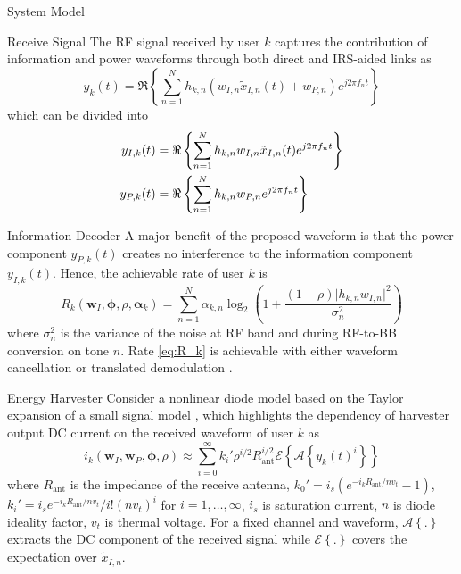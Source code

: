 \documentclass{IEEEtran}
\begin{document}
\begin{section}{System Model}
	\begin{subsection}{Receive Signal}
		The RF signal received by user $k$ captures the contribution of information and power waveforms through both direct and IRS-aided links as
		\begin{equation}\label{eq:y_k}
			y_k(t)=\Re\left\{\sum_{n=1}^N{h_{{k,n}}}\left({w_{I,n}\tilde{x}_{I,n}(t)}+w_{P,n}\right){e^{j2{\pi}{f_n}{t}}}\right\}
		\end{equation}
		which can be divided into
		\begin{align}\label{eq:y_{I/P,k}}
			y_{I,k}(t) & = \Re\left\{\sum_{n=1}^N{h_{{k,n}}}{w_{I,n}\tilde{x}_{I,n}(t)}{e^{j2{\pi}{f_n}{t}}}\right\}\\
			y_{P,k}(t) & = \Re\left\{\sum_{n=1}^N{h_{{k,n}}}w_{P,n}{e^{j2{\pi}{f_n}{t}}}\right\}
		\end{align}
	\end{subsection}

	\begin{subsection}{Information Decoder}
		A major benefit of the proposed waveform is that the power component $y_{P,k}(t)$ creates no interference to the information component $y_{I,k}(t)$. Hence, the achievable rate of user $k$ is
		\begin{equation}\label{eq:R_k}
			R_k(\boldsymbol{w}_I,\boldsymbol{\phi},\rho,\boldsymbol{\alpha}_k)=\sum_{n=1}^N\alpha_{k,n}{\log_2\left(1+\frac{(1-\rho)\lvert h_{k,n}w_{I,n} \rvert^2}{\sigma_n^2}\right)}
		\end{equation}
		where $\sigma_n^2$ is the variance of the noise at RF band and during RF-to-BB conversion on tone $n$. Rate \ref{eq:R_k} is achievable with either waveform cancellation or translated demodulation \cite{Clerckx2018b}.
	\end{subsection}

	\begin{subsection}{Energy Harvester}
		Consider a nonlinear diode model based on the Taylor expansion of a small signal model \cite{Clerckx2016a,Clerckx2018b}, which highlights the dependency of harvester output DC current on the received waveform of user $k$ as
		\begin{equation}\label{eq:i_k}
			i_k(\boldsymbol{w}_I,\boldsymbol{w}_P,\boldsymbol{\phi},\rho)\approx\sum_{i=0}^{\infty}{k_i'}{\rho^{i/2}}{R_{\text{ant}}^{i/2}}\mathcal{E}\left\{{\mathcal{A}\left\{y_k(t)^i\right\}}\right\}
		\end{equation}
		where $R_{\text{ant}}$ is the impedance of the receive antenna, $k_0'=i_s(e^{-i_kR_{\text{ant}}/nv_t}-1)$, $k_i'=i_se^{-i_kR_{\text{ant}}/nv_t}/i!(nv_t)^i$ for $i=1,\dots,\infty$, $i_s$ is saturation current, $n$ is diode ideality factor, $v_t$ is thermal voltage. For a fixed channel and waveform, $\mathcal{A}\left\{.\right\}$ extracts the DC component of the received signal while $\mathcal{E}\left\{.\right\}$ covers the expectation over $\tilde{x}_{I,n}$.


\end{subsection}
\end{section}
\end{document}
